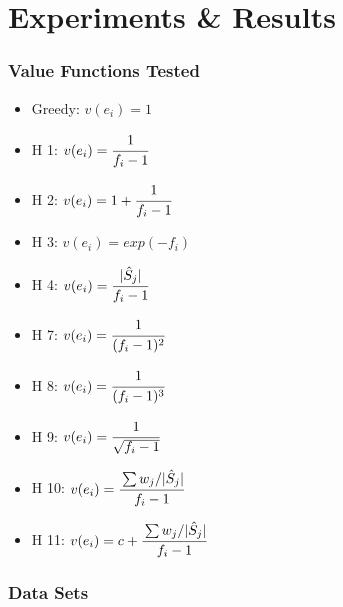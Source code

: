\documentclass[xcolor=dvipsnames]{beamer}
\begin{document}
\section{Experiments \& Results}
\begin{frame}
\frametitle{Value Functions Tested}
\begin{minipage}{0.50\textwidth}
\begin{itemize}
\item Greedy: $v(e_i) = 1$
\item H 1: $v(e_i) = \cfrac{1}{f_i -1}$
\item H 2: $v(e_i) = 1+\cfrac{1}{f_i -1}$
\item H 3: $v(e_i) = exp(-f_i)$
\item H 4: $v(e_i) = \cfrac{|\hat{S}_j|}{f_i -1}$
\item H 7: $v(e_i) = \cfrac{1}{(f_i -1)^2}$
\end{itemize}
\end{minipage}%
\begin{minipage}{0.50\textwidth}
\begin{itemize}
\item H 8: $v(e_i) = \cfrac{1}{(f_i -1)^3}$
\item H 9: $v(e_i) = \cfrac{1}{\sqrt{f_i -1}}$
\item H 10: $v(e_i) = \cfrac{\sum w_j/|\hat{S}_j|}{f_i -1}$
\item H 11: $v(e_i) = c + \cfrac{\sum w_j/|\hat{S}_j|}{f_i -1}$
\end{itemize}
\end{minipage}
\end{frame}

\begin{frame}
\frametitle{Data Sets}
\end{frame}
\end{document}
